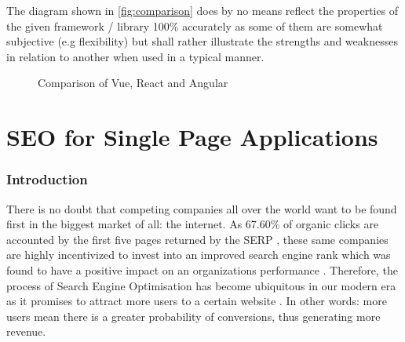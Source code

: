 The diagram shown in \autoref{fig:comparison} does by no means reflect the properties of the given framework / library 100\% accurately as some of them are somewhat subjective (e.g flexibility) but shall rather illustrate the strengths and weaknesses in relation to another when used in a typical manner.

\newcommand\ColorBox[1]{\textcolor{#1}{\rule{2ex}{2ex}}}

\begin{figure}[H]
\begin{center}
\end{center}
\caption{Comparison of Vue, React and Angular}
\label{fig:comparison}
\end{figure}


\section{SEO for Single Page Applications} \label{sec:seo}

\subsubsection{Introduction}
There is no doubt that competing companies all over the world want to be found first in the biggest market of all: the internet. As 67.60\% of organic clicks are accounted by the first five pages returned by the SERP \cite{Khan2018:article}, these same companies are highly incentivized to invest into an improved search engine rank which was found to have a positive impact on an organizations performance \cite{yang2015search:article}. Therefore, the process of Search Engine Optimisation has become ubiquitous in our modern era as it promises to attract more users to a certain website \cite{Khan2018:article}. In other words: more users mean there is a greater probability of conversions, thus generating more revenue.


